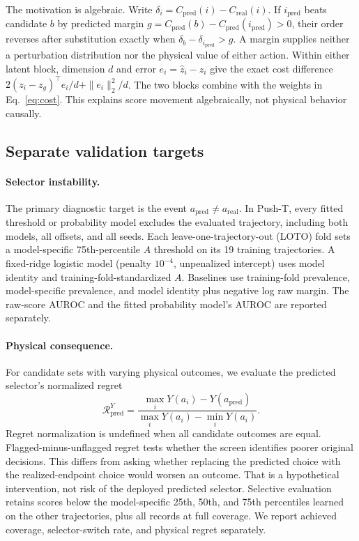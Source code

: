 \documentclass{article}
\begin{document}
The motivation is algebraic. Write
$\delta_i=C_{\mathrm{pred}}(i)-C_{\mathrm{real}}(i)$.
If $i_{\mathrm{pred}}$ beats candidate $b$ by predicted margin
$g=C_{\mathrm{pred}}(b)-C_{\mathrm{pred}}(i_{\mathrm{pred}})>0$,
their order reverses after substitution exactly when
$\delta_b-\delta_{i_{\mathrm{pred}}}>g$.
A margin supplies neither a perturbation distribution nor the physical
value of either action. Within either latent block, dimension $d$ and
error $e_i=\hat z_i-z_i$ give the exact cost difference
$2(z_i-z_g)^\top e_i/d+\|e_i\|_2^2/d$.
The two blocks combine with the weights in Eq.~\ref{eq:cost}. This explains
score movement algebraically, not physical behavior causally.

\subsection{Separate validation targets}

\paragraph{Selector instability.}
The primary diagnostic target is the event
$a_{\mathrm{pred}}\ne a_{\mathrm{real}}$. In Push-T, every fitted
threshold or probability model excludes the evaluated trajectory, including
both models, all offsets, and all seeds. Each leave-one-trajectory-out (LOTO)
fold sets a model-specific 75th-percentile $A$ threshold on its 19 training
trajectories. A fixed-ridge logistic model (penalty $10^{-4}$, unpenalized
intercept) uses model identity and training-fold-standardized $A$. Baselines
use training-fold prevalence, model-specific prevalence, and model identity
plus negative log raw margin. The raw-score AUROC and the fitted probability
model's AUROC are reported separately.

\paragraph{Physical consequence.}
For candidate sets with varying physical outcomes, we evaluate the predicted selector's
normalized regret
\begin{equation}
 \mathcal{R}_{\mathrm{pred}}^Y=
 \frac{\max_iY(a_i)-Y(a_{\mathrm{pred}})}
      {\max_iY(a_i)-\min_iY(a_i)}.
 \label{eq:regret}
\end{equation}
Regret normalization is undefined when all candidate outcomes are equal.
Flagged-minus-unflagged
regret tests whether the screen identifies poorer original decisions. This
differs from asking whether replacing the predicted choice with the
realized-endpoint choice would worsen an outcome. That is a hypothetical
intervention, not risk of the deployed predicted selector. Selective evaluation retains scores below the model-specific
25th, 50th, and 75th percentiles learned on the other trajectories, plus all
records at full coverage. We report achieved coverage, selector-switch rate,
and physical regret separately.
\end{document}
